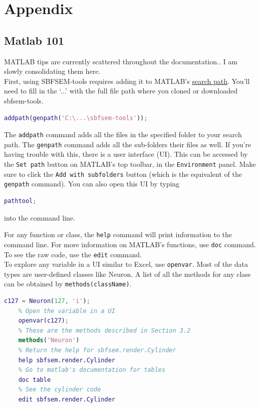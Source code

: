 \documentclass[12pt]{exam}
\begin{document}
	\section{Appendix}
	\subsection{Matlab 101}\label{matlab101}
	MATLAB tips are currently scattered throughout the documentation.. I am slowly consolidating them here.\\
	First, using SBFSEM-tools requires adding it to MATLAB's \href{https://www.mathworks.com/help/matlab/ref/addpath.html}{search path}. You'll need to fill in the `...' with the full file path where you cloned or downloaded sbfsem-tools.
	\begin{lstlisting}[language=matlab]
	addpath(genpath('C:\...\sbfsem-tools'));\end{lstlisting}
	The \texttt{addpath} command adds all the files in the specified folder to your search path. The \texttt{genpath} command adds all the sub-folders their files as well. If you're having trouble with this, there is a user interface (UI). This can be accessed by the \texttt{Set path} button on MATLAB's top toolbar, in the \texttt{Environment} panel. Make sure to click the \texttt{Add with subfolders} button (which is the equivalent of the \texttt{genpath} command). You can also open this UI by typing
	\begin{lstlisting}[language=matlab]
	pathtool;\end{lstlisting}
	into the command line.
	
	For any function or class, the \texttt{help} command will print information to the command line. For more information on MATLAB's functions, use \texttt{doc} command. To see the raw code, use the \texttt{edit} command.\\
	To explore any variable in a UI similar to Excel, use \texttt{openvar}. Most of the data types are user-defined classes like Neuron. A list of all the methods for any class can be obtained by \texttt{methods(className)}.
	\begin{lstlisting}[language=matlab]
	c127 = Neuron(127, 'i');
	% Open the variable in a UI
	openvar(c127);
	% These are the methods described in Section 3.2
	methods('Neuron')
	% Return the help for sbfsem.render.Cylinder
	help sbfsem.render.Cylinder
	% Go to matlab's documentation for tables
	doc table
	% See the cylinder code
	edit sbfsem.render.Cylinder\end{lstlisting}
\end{document}
